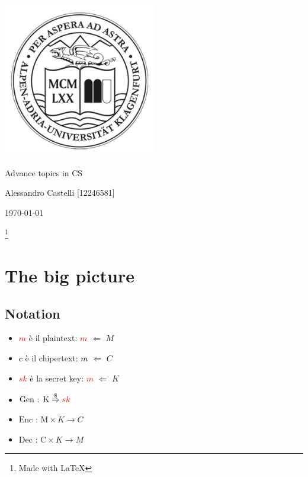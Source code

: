 \documentclass[11pt]{article}
\theoremstyle{definition} \newtheorem{definizione}{Definizione}[section] %
\begin{document}
\begin{titlepage}
    \centering
    \includegraphics[width=0.5\textwidth]{aau.png}
    \vfill
    \begin{center}
        {\LARGE Advance topics in CS \par}
        \vspace{0.5cm}
        {\large Alessandro Castelli [12246581] \par}
        \vspace{0.5cm}
        {\large \today \par}
    \end{center}
    \vfill
\end{titlepage}

\tableofcontents
\footnote{Made with \LaTeX}
\newpage


\section{The big picture}
    \subsection{Notation}
    \begin{itemize}
        \item \textcolor{red}{\textbf{$m$}} è il plaintext: \textcolor{red}{\textbf{$m$}} $\Leftarrow$ $M$
        \item \textcolor{black}{\textbf{$c$}} è il chipertext:  \textcolor{black}{\textbf{$m$}} $\Leftarrow$ $C$
        \item \textcolor{red}{\textbf{$sk$}} è la secret key:  \textcolor{red}{\textbf{$m$}} $\Leftarrow$ $K$
    \end{itemize}

    \begin{itemize}
        \item $ \text{Gen : K} \stackrel{\$}{\Rightarrow} \textcolor{red}{sk}$ 
        \item $ \text{Enc : M} \times K \rightarrow C$
        \item $\text{Dec : C} \times K \rightarrow M$
    \end{itemize}
\end{document}
